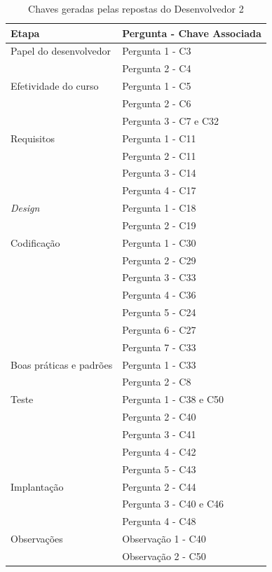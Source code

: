 \begin{table}[h]
	\centering
	\begin{tabular}{|m{4.8cm} | m{4.8cm} |}
		\hline
		\textbf{Etapa} & \textbf{Pergunta - Chave Associada} \\ \hline
		Papel do desenvolvedor & Pergunta 1 - C3 \\ \cline{2-2}
		& Pergunta 2 - C4 \\ \cline{2-2}
		\hline
		Efetividade do curso & Pergunta 1 - C5 \\ \cline{2-2}
		& Pergunta 2 - C6 \\ \cline{2-2}
		& Pergunta 3 - C7 e C32 \\ \cline{2-2}
		\hline
		Requisitos & Pergunta 1 - C11 \\ \cline{2-2}
		 & Pergunta 2 - C11 \\ \cline{2-2}
		& Pergunta 3 - C14 \\ \cline{2-2}
		& Pergunta 4 - C17 \\ \cline{2-2}
		\hline
		\textit{Design} & Pergunta 1 - C18 \\ \cline{2-2}
		& Pergunta 2 - C19 \\ \cline{2-2}
		\hline
		Codificação & Pergunta 1 - C30 \\ \cline{2-2}
		& Pergunta 2 - C29 \\ \cline{2-2}
		& Pergunta 3 - C33 \\ \cline{2-2}
		& Pergunta 4 - C36 \\ \cline{2-2}
		& Pergunta 5 - C24 \\ \cline{2-2}
		& Pergunta 6 - C27 \\ \cline{2-2}
		& Pergunta 7 - C33 \\ \cline{2-2} \hline
		Boas práticas e padrões & Pergunta 1 - C33 \\ \cline{2-2}
		& Pergunta 2 - C8\\ \cline{2-2}
		\hline
		Teste & Pergunta 1 - C38 e C50 \\ \cline{2-2}
		& Pergunta 2 - C40 \\ \cline{2-2}
		& Pergunta 3 - C41 \\ \cline{2-2}
		& Pergunta 4 - C42 \\ \cline{2-2}
		& Pergunta 5 - C43 \\ \cline{2-2}
		\hline
		Implantação & Pergunta 2 - C44 \\ \cline{2-2}
		& Pergunta 3 - C40 e C46 \\ \cline{2-2}
		& Pergunta 4 - C48 \\ \cline{2-2}
		\hline
		Observações & Observação 1 - C40 \\ \cline{2-2}  
		& Observação 2 - C50 \\
		\hline
	\end{tabular}

	\caption{Chaves geradas pelas repostas do Desenvolvedor 2}
	\label{tab03}
\end{table}

